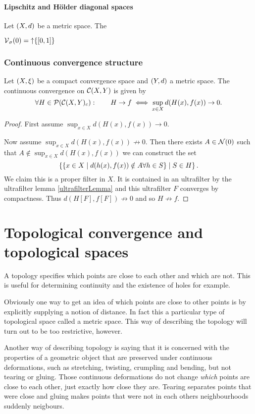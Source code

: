 \subsubsection{Lipschitz and Hölder diagonal spaces}
\begin{definition}
Let $\left( X,d \right)$ be a metric space. The 
\end{definition}
$\vicinity_\sigma(0) = \upset\{\interval{0,1}\}$


\subsection{Continuous convergence structure}
\begin{proposition}
Let $\left( X,\xi \right)$ be a compact convergence space and $\left( Y,d \right)$ a metric space. The continuous convergence on $\operatorname{\mathcal{C}}(X,Y)$ is given by
\[ \forall H\in\operatorname{\mathcal{P}}(\operatorname{\mathcal{C}}(X,Y)_c): \qquad H\to f \iff \sup_{x\in X}d(H(x), f(x)) \to 0. \]
\end{proposition}
\begin{proof}
First assume $\sup_{x\in X}d(H(x), f(x)) \to 0$. 

Now assume $\sup_{x\in X}d(H(x), f(x)) \not\to 0$. Then there exists $A\in \operatorname{\mathcal{N}}(0)$ such that $A \notin \sup_{x\in X}d(H(x), f(x))$ we can construct the set
\[ \left\{ \left\{ x\in X \;\middle|\; d(h(x), f(x)) \notin A \forall h\in S \right\} \;\middle|\; S\in H \right\}. \]
We claim this is a proper filter in $X$. It is contained in an ultrafilter by the ultrafilter lemma \ref{ultrafilterLemma} and this ultrafilter $F$ converges by compactness. Thus $d(H[F], f[F]) \not\to 0$ and so $H\not\to f$.
\end{proof}

\chapter{Topological convergence and topological spaces}
A topology specifies which points are close to each other and which are not. This is useful for determining continuity and the existence of holes for example.

Obviously one way to get an idea of which points are close to other points is by explicitly supplying a notion of distance. In fact this a particular type of topological space called a metric space. This way of describing the topology will turn out to be too restrictive, however.

Another way of describing topology is saying that it is concerned with the properties of a geometric object that are preserved under continuous deformations, such as stretching, twisting, crumpling and bending, but not tearing or gluing. Those continuous deformations do not change \textit{which} points are close to each other, just exactly how close they are. Tearing separates points that were close and gluing makes points that were not in each others neighbourhoods suddenly neigbours.

